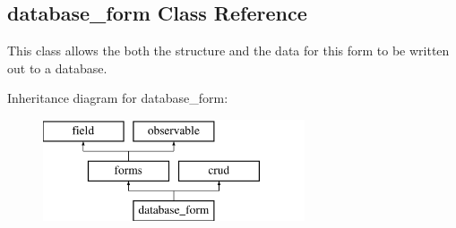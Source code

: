 \hypertarget{classdatabase__form}{\subsection{database\-\_\-form Class Reference}
\label{classdatabase__form}
}


This class allows the both the structure and the data for this form to be written out to a database.  


Inheritance diagram for database\-\_\-form\-:\begin{figure}[H]
\begin{center}
\leavevmode
\includegraphics[height=3.000000cm]{classdatabase__form}
\end{center}
\end{figure}

